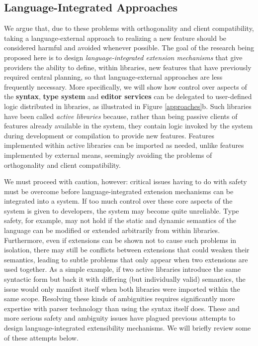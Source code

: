 \subsection{Language-Integrated Approaches}\label{language-integrated-approaches}
We argue that, due to these problems with orthogonality and client compatibility, taking a language-external approach to realizing a new feature should be considered harmful and avoided whenever possible. The goal of the research being proposed here is to design \emph{language-integrated extension mechanisms} that give providers the ability to define, within libraries, new features that have previously required central planning, 
so that language-external approaches are less frequently necessary. More specifically, we will show how control over aspects of the \textbf{syntax}, \textbf{type system} and \textbf{editor services} can be delegated to user-defined logic distributed in {libraries}, as illustrated in Figure \ref{approaches}b. 
Such libraries have been called \emph{active libraries}  \cite{activelibraries} because, rather than being passive clients of features already available in the system, they contain logic invoked by the system during development or compilation to provide new features. Features implemented within active libraries can be imported as needed, unlike features implemented by external means, seemingly avoiding the problems of orthogonality and client compatibility.

We must proceed with caution, however: critical issues having to do with {safety} must be overcome before language-integrated extension mechanisms can be integrated into a system. If too much control over  these core aspects of the system is given  to developers, the system may become quite unreliable. 
Type safety, for example, may not hold if the static and dynamic semantics of the language can be modified or extended arbitrarily from within libraries. Furthermore, even if extensions can be shown not to cause such problems in isolation, there may still be conflicts between extensions that could weaken their semantics, leading to subtle problems that only appear when two extensions are used together. As a simple example, if two active libraries introduce the same syntactic form but back it with differing (but individually valid) semantics, the issue would only manifest itself when both libraries were imported within the same scope. Resolving these kinds of ambiguities requires significantly more expertise with parser technology than using the syntax itself does. These and more serious safety and ambiguity issues have plagued previous attempts to design language-integrated extensibility mechanisms. We will briefly review some of these attempts below.%


